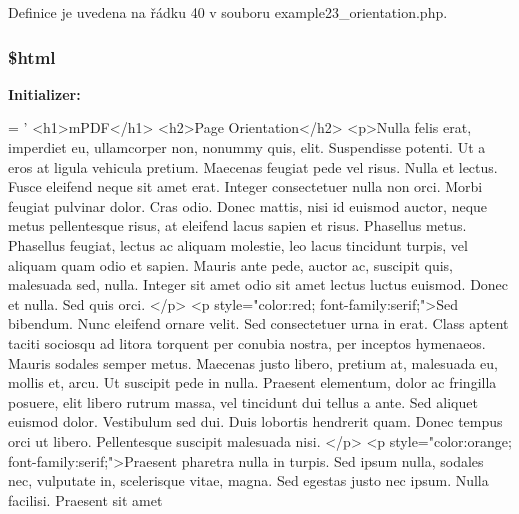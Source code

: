 Definice je uvedena na řádku 40 v souboru example23\-\_\-orientation.\-php.

\hypertarget{example23__orientation_8php_a6f96e7fc92441776c9d1cd3386663b40}{
\subsubsection[{\$html}]{\setlength{\rightskip}{0pt plus 5cm}\$html}}\label{example23__orientation_8php_a6f96e7fc92441776c9d1cd3386663b40}
{\bfseries Initializer\-:}
\begin{DoxyCode}
= \textcolor{stringliteral}{'}
\textcolor{stringliteral}{<h1>mPDF</h1>}
\textcolor{stringliteral}{<h2>Page Orientation</h2>}
\textcolor{stringliteral}{}
\textcolor{stringliteral}{<p>Nulla felis erat, imperdiet eu, ullamcorper non, nonummy quis, elit. Suspendisse potenti. Ut a eros at
       ligula vehicula pretium. Maecenas feugiat pede vel risus. Nulla et lectus. Fusce eleifend neque sit amet
       erat. Integer consectetuer nulla non orci. Morbi feugiat pulvinar dolor. Cras odio. Donec mattis, nisi id
       euismod auctor, neque metus pellentesque risus, at eleifend lacus sapien et risus. Phasellus metus. Phasellus
       feugiat, lectus ac aliquam molestie, leo lacus tincidunt turpis, vel aliquam quam odio et sapien. Mauris ante
       pede, auctor ac, suscipit quis, malesuada sed, nulla. Integer sit amet odio sit amet lectus luctus euismod.
       Donec et nulla. Sed quis orci. </p>}
\textcolor{stringliteral}{}
\textcolor{stringliteral}{}
\textcolor{stringliteral}{<p style="color:red; font-family:serif;">Sed bibendum. Nunc eleifend ornare velit. Sed consectetuer urna in
       erat. Class aptent taciti sociosqu ad litora torquent per conubia nostra, per inceptos hymenaeos. Mauris
       sodales semper metus. Maecenas justo libero, pretium at, malesuada eu, mollis et, arcu. Ut suscipit pede in
       nulla. Praesent elementum, dolor ac fringilla posuere, elit libero rutrum massa, vel tincidunt dui tellus a
       ante. Sed aliquet euismod dolor. Vestibulum sed dui. Duis lobortis hendrerit quam. Donec tempus orci ut
       libero. Pellentesque suscipit malesuada nisi. </p>}
\textcolor{stringliteral}{<p style="color:orange; font-family:serif;">Praesent pharetra nulla in turpis. Sed ipsum nulla, sodales
       nec, vulputate in, scelerisque vitae, magna. Sed egestas justo nec ipsum. Nulla facilisi. Praesent sit amet
}
\end{DoxyCode}
